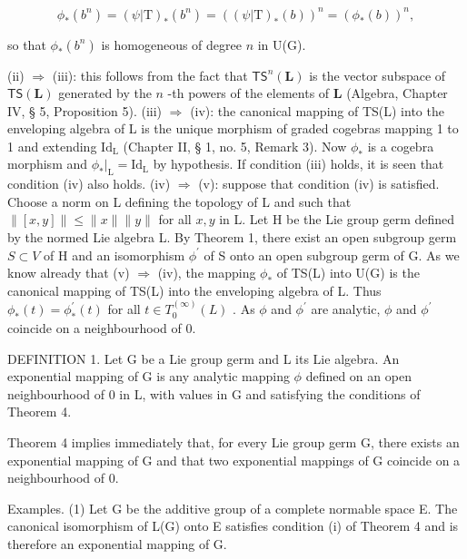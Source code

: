 \[
\phi_ {*} (b ^ {n}) = (\psi | \mathrm{T}) _ {*} (b ^ {n}) = ((\psi | \mathrm{T}) _ {*} (b)) ^ {n} = (\phi_ {*} (b)) ^ {n},
\]

so that \(\phi_{*}(b^{n})\) is homogeneous of degree \(n\) in U(G).

(ii) \(\Rightarrow\) (iii): this follows from the fact that \(\mathsf{TS}^n (\mathbf{L})\) is the vector subspace of \(\mathsf{TS}(\mathbf{L})\) generated by the \(n\) -th powers of the elements of \(\mathbf{L}\) (Algebra, Chapter IV, § 5, Proposition 5).
(iii) \(\Rightarrow\) (iv): the canonical mapping of TS(L) into the enveloping algebra of L is the unique morphism of graded cogebras mapping 1 to 1 and extending \(\mathrm{Id}_{\mathrm{L}}\) (Chapter II, § 1, no. 5, Remark 3). Now \(\phi_{*}\) is a cogebra morphism and \(\phi_{*}|_{\mathrm{L}} = \mathrm{Id}_{\mathrm{L}}\) by hypothesis. If condition (iii) holds, it is seen that condition (iv) also holds.
(iv) \(\Rightarrow\) (v): suppose that condition (iv) is satisfied. Choose a norm on L defining the topology of L and such that \(\| [x,y]\| \leqslant \| x\| \| y\|\) for all \(x,y\) in L. Let H be the Lie group germ defined by the normed Lie algebra L. By Theorem 1, there exist an open subgroup germ \(S\subset V\) of H and an isomorphism \(\phi^{\prime}\) of S onto an open subgroup germ of G. As we know already that (v) \(\Rightarrow\) (iv), the mapping \(\phi_{*}\) of TS(L) into U(G) is the canonical mapping of TS(L) into the enveloping algebra of L. Thus \(\phi_{*}(t) = \phi_{*}^{\prime}(t)\) for all \(t\in T_0^{(\infty)}(L)\) . As \(\phi\) and \(\phi^{\prime}\) are analytic, \(\phi\) and \(\phi^{\prime}\) coincide on a neighbourhood of 0.

DEFINITION 1. Let G be a Lie group germ and L its Lie algebra. An exponential mapping of G is any analytic mapping \(\phi\) defined on an open neighbourhood of 0 in L, with values in G and satisfying the conditions of Theorem 4.

Theorem 4 implies immediately that, for every Lie group germ G, there exists an exponential mapping of G and that two exponential mappings of G coincide on a neighbourhood of 0.

Examples. (1) Let G be the additive group of a complete normable space E. The canonical isomorphism of L(G) onto E satisfies condition (i) of Theorem 4 and is therefore an exponential mapping of G.

